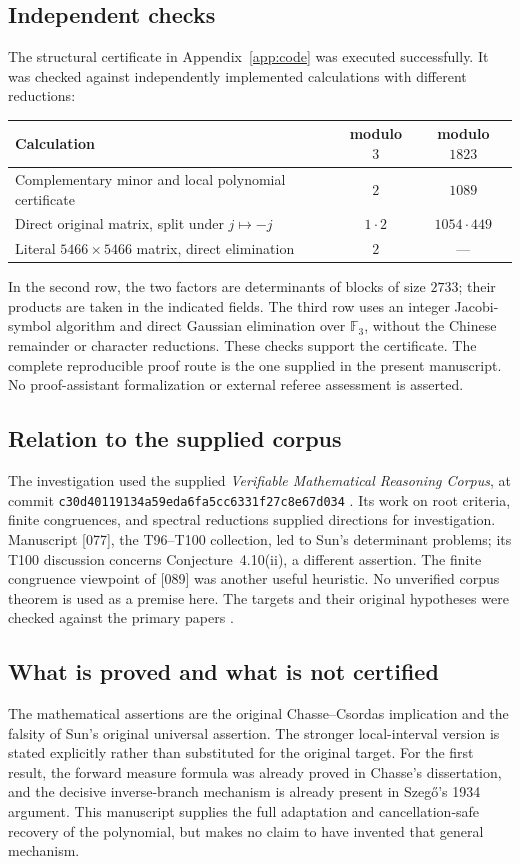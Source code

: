 \documentclass[11pt,a4paper]{article}
\theoremstyle{remark}
\newcommand{\F}{\mathbb F}
\begin{document}
\subsection{Independent checks}
The structural certificate in Appendix~\ref{app:code} was executed
successfully. It was checked against independently implemented
calculations with different reductions:
\begin{center}
\begin{tabular}{@{}p{}cc@{}}
\toprule
Calculation & modulo \(3\) & modulo \(1823\)\\
\midrule
Complementary minor and local polynomial certificate & \(2\) & \(1089\)\\
Direct original matrix, split under \(j\mapsto-j\) & \(1\cdot2\) & \(1054\cdot449\)\\
Literal \(5466\times5466\) matrix, direct elimination & \(2\) & ---\\
\bottomrule
\end{tabular}
\end{center}
In the second row, the two factors are determinants of blocks of
size \(2733\); their products are taken in the indicated fields.
The third row uses an integer Jacobi-symbol algorithm and direct
Gaussian elimination over \(\F_3\), without the Chinese remainder
or character reductions.
These checks support the certificate. The complete reproducible
proof route is the one supplied in the present manuscript.
No proof-assistant formalization or external referee assessment
is asserted.


\subsection{Relation to the supplied corpus}
The investigation used the supplied
\emph{Verifiable Mathematical Reasoning Corpus}, at commit
\texttt{c30d40119134a59eda6fa5cc6331f27c8e67d034}
\cite{Corpus}. Its work on root criteria, finite congruences, and
spectral reductions supplied directions for investigation.
Manuscript [077], the T96--T100 collection, led to Sun's determinant
problems; its T100 discussion concerns Conjecture~4.10(ii), a different
assertion. The finite congruence viewpoint of [089] was another useful
heuristic. No unverified corpus theorem is used as a premise here.
The targets and their original hypotheses were checked against the
primary papers \cite{ChasseCsordas2012,Sun2024}.

\subsection{What is proved and what is not certified}
The mathematical assertions are the original Chasse--Csordas
implication and the falsity of Sun's original universal assertion.
The stronger local-interval version is stated explicitly rather than
substituted for the original target.
For the first result, the forward measure formula was already proved
in Chasse's dissertation, and the decisive inverse-branch mechanism
is already present in Szeg\H{o}'s 1934 argument.
This manuscript supplies the full adaptation and cancellation-safe
recovery of the polynomial, but makes no claim to have invented that
general mechanism.
\end{document}

